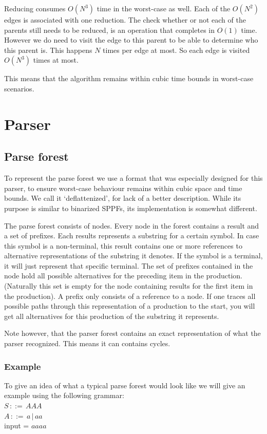 \documentclass[a4paper,10pt]{article}
\begin{document}
Reducing consumes $O(N^3)$ time in the worst-case as well. Each of the $O(N^2)$ edges is associated with one reduction. The check whether or not each of the parents still needs to be reduced, is an operation that completes in $O(1)$ time. However we do need to visit the edge to this parent to be able to determine who this parent is. This happens $N$ times per edge at most. So each edge is visited $O(N^3)$ times at most.

This means that the algorithm remains within cubic time bounds in worst-case scenarios.

\section{Parser}

\subsection{Parse forest}

To represent the parse forest we use a format that was especially designed for this parser, to ensure worst-case behaviour remains within cubic space and time bounds. We call it `deflattenized', for lack of a better description. While its purpose is similar to binarized SPPFs, its implementation is somewhat different.

The parse forest consists of nodes. Every node in the forest contains a result and a set of prefixes. Each results represents a substring for a certain symbol. In case this symbol is a non-terminal, this result contains one or more references to alternative representations of the substring it denotes. If the symbol is a terminal, it will just represent that specific terminal. The set of prefixes contained in the node hold all possible alternatives for the preceding item in the production. (Naturally this set is empty for the node containing results for the first item in the production). A prefix only consists of a reference to a node. If one traces all possible paths through this representation of a production to the start, you will get all alternatives for this production of the substring it represents.

Note however, that the parser forest contains an exact representation of what the parser recognized. This means it can contains cycles.

\pagebreak
\subsubsection{Example}
To give an idea of what a typical parse forest would look like we will give an example using the following grammar:\\
$S\,::=\,AAA$\\
$A\,::=\,a\,|\,aa$\\
input = $aaaa$
\end{document}
